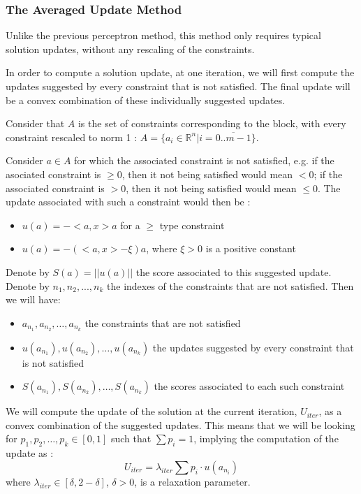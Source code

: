 \documentclass[a4paper,twoside,10pt]{report}
\begin{document}
\clearpage	

	\subsubsection{The Averaged Update Method}
	
	Unlike the previous perceptron method, this method only requires typical solution updates, without any rescaling of the constraints.
	
	In order to compute a solution update, at one iteration, we will first compute the updates suggested by every constraint that is not satisfied. The final update will be a convex combination of these individually suggested updates. 
	
	Consider that \(A\) is the set of constraints corresponding to the block, with every constraint rescaled to norm 1 : \(A = \{a_i\in \mathbb{R}^n | i = \overline{0..m-1}\}\).
	
	Consider \(a\in A\) for which the associated constraint is not satisfied, e.g. if the asociated constraint is \(<a,x> \geq 0\), then it not being satisfied would mean \(<a, x> < 0\); if the associated constraint is \(<a, x> > 0\), then it not being satisfied would mean \(<a, x> \leq 0\). The update associated with such a constraint would then be :
	
		\begin{itemize}
			\item \(u(a) = -<a, x> a\) for a \(\geq\) type constraint
			\item \(u(a) = -(<a, x> - \xi) a\), where \(\xi > 0\) is a positive constant 
		\end{itemize}
	
	
	Denote by \(S(a) = ||u(a)||\) the score associated to this suggested update. Denote by \(n_1, n_2,..., n_k\) the indexes of the constraints that are not satisfied. Then we will have:
	
	\begin{itemize}
		\item \(a_{n_1}, a_{n_2},\ldots, a_{n_k}\) the constraints that are not satisfied
		\item \(u(a_{n_1}), u(a_{n_2}),\ldots, u(a_{n_k})\) the updates suggested by every constraint that is not satisfied
		\item \(S(a_{n_1}), S(a_{n_2}),\ldots, S(a_{n_k})\) the scores associated to each such constraint
	\end{itemize}
	
	We will compute the update of the solution at the current iteration, \(U_{iter}\), as a convex combination of the suggested updates. This means that we will be looking for \(p_1, p_2, \ldots, p_k \in [0, 1]\) such that \(\sum{p_i} = 1\), implying the computation of the update as :	
	\[
		U_{iter} = \lambda_{iter} \sum{p_i \cdot u(a_{n_i})}
	\] 
	where \(\lambda_{iter}\in [\delta, 2-\delta]\), \(\delta > 0\), is a relaxation parameter.
	
\end{document}

